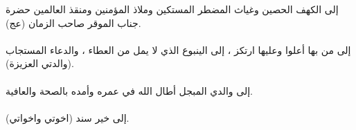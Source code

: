 إلى الكهف الحصين وغياث المضطر المستكين وملاذ المؤمنين ومنقذ العالمين حضرة جناب الموقر صاحب الزمان (عج).\\
\\
إلى من بها أعلوا وعليها ارتكز ، إلى الينبوع الذي لا يمل من العطاء ، والدعاء المستجاب (والدتي العزيزة).\\
\\
إلى والدي المبجل أطال الله في عمره وأمده بالصحة والعافية.\\
\\
إلى خير سند (اخوتي واخواتي).
